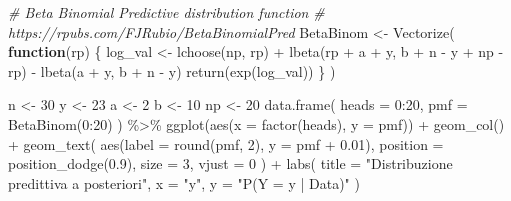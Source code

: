 \documentclass[
  11pt,
  italian,
  a4paper,
  extrafontsizes,onecolumn,openright
  ]{memoir}
\newenvironment{Shaded}{\begin{snugshade}}{\end{snugshade}}
\newcommand{\AttributeTok}[1]{\textcolor[rgb]{0.77,0.63,0.00}{#1}}
\newcommand{\CommentTok}[1]{\textcolor[rgb]{0.56,0.35,0.01}{\textit{#1}}}
\newcommand{\ControlFlowTok}[1]{\textcolor[rgb]{0.13,0.29,0.53}{\textbf{#1}}}
\newcommand{\DecValTok}[1]{\textcolor[rgb]{0.00,0.00,0.81}{#1}}
\newcommand{\FloatTok}[1]{\textcolor[rgb]{0.00,0.00,0.81}{#1}}
\newcommand{\FunctionTok}[1]{\textcolor[rgb]{0.00,0.00,0.00}{#1}}
\newcommand{\NormalTok}[1]{#1}
\newcommand{\OtherTok}[1]{\textcolor[rgb]{0.56,0.35,0.01}{#1}}
\newcommand{\SpecialCharTok}[1]{\textcolor[rgb]{0.00,0.00,0.00}{#1}}
\newcommand{\StringTok}[1]{\textcolor[rgb]{0.31,0.60,0.02}{#1}}
\theoremstyle{definition}
\theoremstyle{definition}
\theoremstyle{definition}
\theoremstyle{definition}
\theoremstyle{remark}
\begin{document}
\begin{Shaded}
\begin{Highlighting}[]
\CommentTok{\# Beta Binomial Predictive distribution function}
\CommentTok{\# https://rpubs.com/FJRubio/BetaBinomialPred}
\NormalTok{BetaBinom }\OtherTok{\textless{}{-}} \FunctionTok{Vectorize}\NormalTok{(}
  \ControlFlowTok{function}\NormalTok{(rp) \{}
\NormalTok{    log\_val }\OtherTok{\textless{}{-}} \FunctionTok{lchoose}\NormalTok{(np, rp) }\SpecialCharTok{+}
      \FunctionTok{lbeta}\NormalTok{(rp }\SpecialCharTok{+}\NormalTok{ a }\SpecialCharTok{+}\NormalTok{ y, b }\SpecialCharTok{+}\NormalTok{ n }\SpecialCharTok{{-}}\NormalTok{ y }\SpecialCharTok{+}\NormalTok{ np }\SpecialCharTok{{-}}\NormalTok{ rp) }\SpecialCharTok{{-}}
      \FunctionTok{lbeta}\NormalTok{(a }\SpecialCharTok{+}\NormalTok{ y, b }\SpecialCharTok{+}\NormalTok{ n }\SpecialCharTok{{-}}\NormalTok{ y)}
    \FunctionTok{return}\NormalTok{(}\FunctionTok{exp}\NormalTok{(log\_val))}
\NormalTok{  \}}
\NormalTok{)}

\NormalTok{n }\OtherTok{\textless{}{-}} \DecValTok{30}
\NormalTok{y }\OtherTok{\textless{}{-}} \DecValTok{23}
\NormalTok{a }\OtherTok{\textless{}{-}} \DecValTok{2}
\NormalTok{b }\OtherTok{\textless{}{-}} \DecValTok{10}
\NormalTok{np }\OtherTok{\textless{}{-}} \DecValTok{20}
\FunctionTok{data.frame}\NormalTok{(}
  \AttributeTok{heads =} \DecValTok{0}\SpecialCharTok{:}\DecValTok{20}\NormalTok{,}
  \AttributeTok{pmf =} \FunctionTok{BetaBinom}\NormalTok{(}\DecValTok{0}\SpecialCharTok{:}\DecValTok{20}\NormalTok{)}
\NormalTok{) }\SpecialCharTok{\%\textgreater{}\%}
  \FunctionTok{ggplot}\NormalTok{(}\FunctionTok{aes}\NormalTok{(}\AttributeTok{x =} \FunctionTok{factor}\NormalTok{(heads), }\AttributeTok{y =}\NormalTok{ pmf)) }\SpecialCharTok{+}
  \FunctionTok{geom\_col}\NormalTok{() }\SpecialCharTok{+}
  \FunctionTok{geom\_text}\NormalTok{(}
    \FunctionTok{aes}\NormalTok{(}\AttributeTok{label =} \FunctionTok{round}\NormalTok{(pmf, }\DecValTok{2}\NormalTok{), }\AttributeTok{y =}\NormalTok{ pmf }\SpecialCharTok{+} \FloatTok{0.01}\NormalTok{),}
    \AttributeTok{position =} \FunctionTok{position\_dodge}\NormalTok{(}\FloatTok{0.9}\NormalTok{),}
    \AttributeTok{size =} \DecValTok{3}\NormalTok{,}
    \AttributeTok{vjust =} \DecValTok{0}
\NormalTok{  ) }\SpecialCharTok{+}
  \FunctionTok{labs}\NormalTok{(}
    \AttributeTok{title =} \StringTok{"Distribuzione predittiva a posteriori"}\NormalTok{,}
    \AttributeTok{x =} \StringTok{"y\textquotesingle{}"}\NormalTok{,}
    \AttributeTok{y =} \StringTok{"P(Y = y\textquotesingle{} | Data)"}
\NormalTok{  )}
\end{Highlighting}
\end{Shaded}
\end{document}

